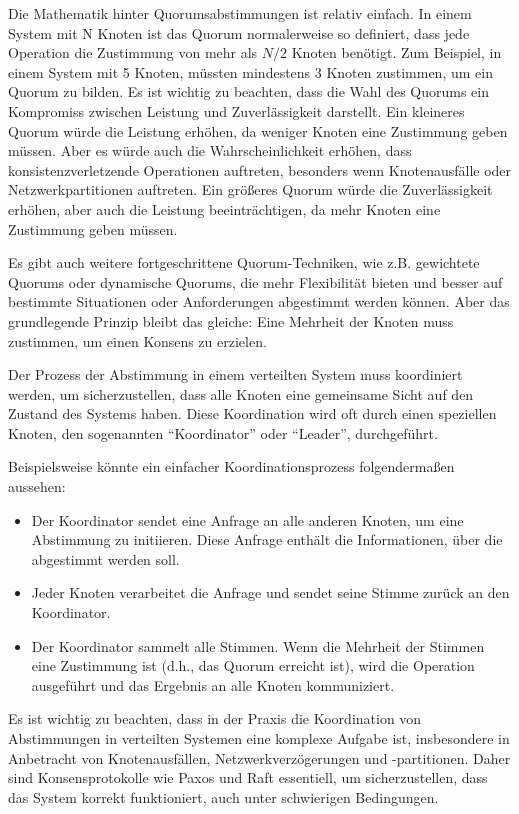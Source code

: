 Die Mathematik hinter Quorumsabstimmungen ist relativ einfach. In einem System mit N Knoten ist das Quorum normalerweise so definiert, dass jede Operation die Zustimmung von mehr als $N/2$ Knoten benötigt. Zum Beispiel, in einem System mit 5 Knoten, müssten mindestens 3 Knoten zustimmen, um ein Quorum zu bilden.
Es ist wichtig zu beachten, dass die Wahl des Quorums ein Kompromiss zwischen Leistung und Zuverlässigkeit darstellt. Ein kleineres Quorum würde die Leistung erhöhen, da weniger Knoten eine Zustimmung geben müssen. Aber es würde auch die Wahrscheinlichkeit erhöhen, dass konsistenzverletzende Operationen auftreten, besonders wenn Knotenausfälle oder Netzwerkpartitionen auftreten. Ein größeres Quorum würde die Zuverlässigkeit erhöhen, aber auch die Leistung beeinträchtigen, da mehr Knoten eine Zustimmung geben müssen.

Es gibt auch weitere fortgeschrittene Quorum-Techniken, wie z.B. gewichtete Quorums oder dynamische Quorums, die mehr Flexibilität bieten und besser auf bestimmte Situationen oder Anforderungen abgestimmt werden können. Aber das grundlegende Prinzip bleibt das gleiche: Eine Mehrheit der Knoten muss zustimmen, um einen Konsens zu erzielen.

Der Prozess der Abstimmung in einem verteilten System muss koordiniert werden, um sicherzustellen, dass alle Knoten eine gemeinsame Sicht auf den Zustand des Systems haben. Diese Koordination wird oft durch einen speziellen Knoten, den sogenannten \enquote{Koordinator} oder \enquote{Leader}, durchgeführt.

Beispielsweise könnte ein einfacher Koordinationsprozess folgendermaßen aussehen:
\begin{itemize}
\item Der Koordinator sendet eine Anfrage an alle anderen Knoten, um eine Abstimmung zu initiieren. Diese Anfrage enthält die Informationen, über die abgestimmt werden soll.
\item Jeder Knoten verarbeitet die Anfrage und sendet seine Stimme zurück an den Koordinator.
\item Der Koordinator sammelt alle Stimmen. Wenn die Mehrheit der Stimmen eine Zustimmung ist (d.h., das Quorum erreicht ist), wird die Operation ausgeführt und das Ergebnis an alle Knoten kommuniziert.
\end{itemize}

Es ist wichtig zu beachten, dass in der Praxis die Koordination von Abstimmungen in verteilten Systemen eine komplexe Aufgabe ist, insbesondere in Anbetracht von Knotenausfällen, Netzwerkverzögerungen und -partitionen. Daher sind Konsensprotokolle wie Paxos und Raft essentiell, um sicherzustellen, dass das System korrekt funktioniert, auch unter schwierigen Bedingungen.

